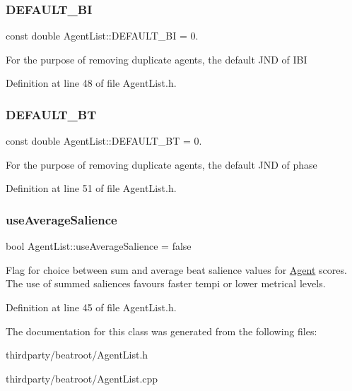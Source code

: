 \subsubsection{\texorpdfstring{D\+E\+F\+A\+U\+L\+T\+\_\+\+BI}{DEFAULT\_BI}}
{\footnotesize\ttfamily const double Agent\+List\+::\+D\+E\+F\+A\+U\+L\+T\+\_\+\+BI = 0.\hspace{0.3cm}{\ttfamily [static]}}

For the purpose of removing duplicate agents, the default J\+ND of I\+BI 

Definition at line 48 of file Agent\+List.\+h.

\mbox{\label{class_agent_list_aa06e5fc242ea1f390252c4e2a03ce163}} 
\subsubsection{\texorpdfstring{D\+E\+F\+A\+U\+L\+T\+\_\+\+BT}{DEFAULT\_BT}}
{\footnotesize\ttfamily const double Agent\+List\+::\+D\+E\+F\+A\+U\+L\+T\+\_\+\+BT = 0.\hspace{0.3cm}{\ttfamily [static]}}

For the purpose of removing duplicate agents, the default J\+ND of phase 

Definition at line 51 of file Agent\+List.\+h.

\mbox{\label{class_agent_list_a0c56c3377c849c460e5a74c835d4f635}} 
\subsubsection{\texorpdfstring{use\+Average\+Salience}{useAverageSalience}}
{\footnotesize\ttfamily bool Agent\+List\+::use\+Average\+Salience = false\hspace{0.3cm}{\ttfamily [static]}}

Flag for choice between sum and average beat salience values for \hyperlink{class_agent}{Agent} scores. The use of summed saliences favours faster tempi or lower metrical levels. 

Definition at line 45 of file Agent\+List.\+h.



The documentation for this class was generated from the following files\+:\begin{DoxyCompactItemize}
\item 
thirdparty/beatroot/Agent\+List.\+h\item 
thirdparty/beatroot/Agent\+List.\+cpp\end{DoxyCompactItemize}
